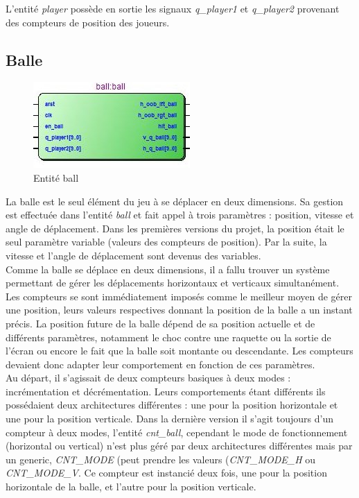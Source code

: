 L'entité \emph{player} possède en sortie les signaux \emph{q\_player1} et \emph{q\_player2} provenant des compteurs de position des joueurs.

\newpage
\subsection{Balle}
\begin{figure}[h!]
	\centering
	\includegraphics[scale=1.0]{images/ball.jpg}
	\caption{Entité ball}
	\label{fig:ball}
\end{figure}

La balle est le seul élément du jeu à se déplacer en deux dimensions. Sa gestion est effectuée dans l'entité \emph{ball} et  fait appel à trois paramètres : position, vitesse et angle de déplacement. Dans les premières versions du projet, la position était le seul paramètre variable (valeurs des compteurs de position). Par la suite, la vitesse et l'angle de déplacement sont devenus des variables.\\

Comme la balle se déplace en deux dimensions, il a fallu trouver un système permettant de gérer les déplacements horizontaux et verticaux simultanément. Les compteurs se sont immédiatement imposés comme le meilleur moyen de gérer une position, leurs valeurs respectives donnant la position de la balle a un instant précis. La position future de la balle dépend de sa position actuelle et de différents paramètres, notamment le choc contre une raquette ou la sortie de l'écran ou encore le fait que la balle soit montante ou descendante. Les compteurs devaient donc adapter leur comportement en fonction de ces paramètres.\\

Au départ, il s'agissait de deux compteurs basiques à deux modes : incrémentation et  décrémentation. Leurs comportements étant différents ils possédaient deux architectures différentes : une pour la position horizontale et une pour la position verticale. Dans la dernière version il s'agit toujours d'un compteur à deux modes, l'entité \emph{cnt\_ball}, cependant le mode de fonctionnement (horizontal ou vertical) n'est plus géré par deux architectures différentes mais par un generic, \emph{CNT\_MODE} (peut prendre les valeurs (\emph{CNT\_MODE\_H} ou \emph{CNT\_MODE\_V}. Ce compteur est instancié deux fois, une pour la position horizontale de la balle, et l'autre pour la position verticale.\\

